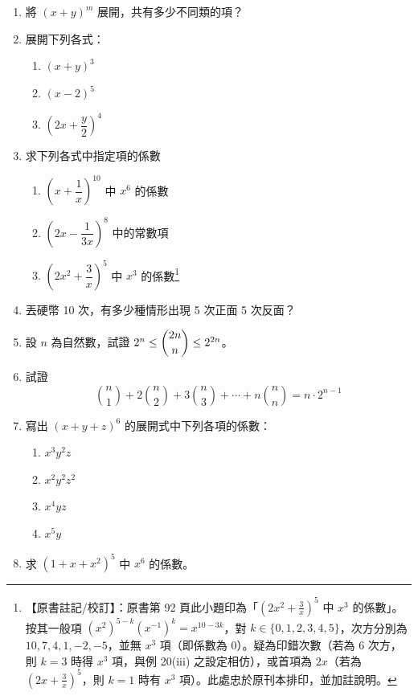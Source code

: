 \begin{enumerate}[label=\arabic*.]
  \item 將 $(x + y)^m$ 展開，共有多少不同類的項？
  \item 展開下列各式：
  \begin{enumerate}[label=(\arabic*)]
    \item $(x + y)^3$
    \item $(x - 2)^5$
    \item $\left(2x + \dfrac{y}{2}\right)^4$
  \end{enumerate}
  \item 求下列各式中指定項的係數
  \begin{enumerate}[label=(\arabic*)]
    \item $\left(x + \dfrac{1}{x}\right)^{10}$ 中 $x^6$ 的係數
    \item $\left(2x - \dfrac{1}{3x}\right)^8$ 中的常數項
    \item $\left(2x^2 + \dfrac{3}{x}\right)^5$ 中 $x^3$ 的係數\label{note:b5-ch2-p92-q3-3}\footnote{【原書註記/校訂】：原書第 92 頁此小題印為「$\left(2x^2 + \frac{3}{x}\right)^5$ 中 $x^3$ 的係數」。按其一般項 $(x^2)^{5-k}(x^{-1})^k = x^{10-3k}$，對 $k \in \{0, 1, 2, 3, 4, 5\}$，次方分別為 $10, 7, 4, 1, -2, -5$，並無 $x^3$ 項（即係數為 0）。疑為印錯次數（若為 6 次方，則 $k=3$ 時得 $x^3$ 項，與例 20(iii) 之設定相仿），或首項為 $2x$（若為 $(2x + \frac{3}{x})^5$，則 $k=1$ 時有 $x^3$ 項）。此處忠於原刊本排印，並加註說明。}
  \end{enumerate}
  \item 丟硬幣 10 次，有多少種情形出現 5 次正面 5 次反面？
  \item 設 $n$ 為自然數，試證 $2^n \le \dbinom{2n}{n} \le 2^{2n}$。
  \item[*6.] 試證
  \[ \binom{n}{1} + 2\binom{n}{2} + 3\binom{n}{3} + \dotsb + n\binom{n}{n} = n \cdot 2^{n-1} \]
  \item 寫出 $(x + y + z)^6$ 的展開式中下列各項的係數：
  \begin{enumerate}[label=(\arabic*)]
    \item $x^3 y^2 z$
    \item $x^2 y^2 z^2$
    \item $x^4 y z$
    \item $x^5 y$
  \end{enumerate}
  \item[*8.] 求 $(1 + x + x^2)^5$ 中 $x^6$ 的係數。
\end{enumerate}

